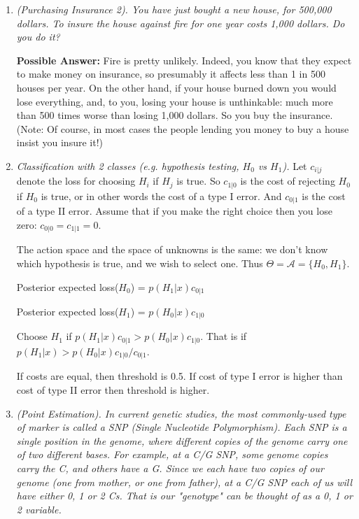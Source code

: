 \documentclass[12pt]{article}
\def\A{\mathcal A}
\begin{document}
\begin{enumerate}
\medskip

\item {\it (Purchasing Insurance 2). You have just bought a new house, for 500,000 dollars.
To insure the house against fire for one year costs 1,000 dollars. Do you do it?}

{\bf Possible Answer:}  Fire is pretty unlikely. Indeed, you know that they expect to make
money on insurance, so presumably it affects less than 1 in 500 houses per year. On the other
hand, if your house burned down you would lose everything, and, to you, 
losing your house is unthinkable: much more than 500 times worse than losing 1,000 dollars.
So you buy the insurance. (Note: Of course, in most cases the people lending you money to buy a house
insist you insure it!)

\item {\it Classification with 2 classes (e.g. hypothesis testing, $H_0$ vs $H_1$).} Let $c_{i|j}$ denote the loss for choosing $H_i$ if $H_j$ is true.
So $c_{1|0}$ is the cost of rejecting $H_0$ if $H_0$ is true, or in other words the cost of a type I error. 
And $c_{0|1}$ is the cost of a type II error.
Assume that if you make the right choice then you lose zero:
$c_{0|0}=c_{1|1}=0$.

The action space and the space of unknowns is the same: we
don't know which hypothesis is true, and we wish to select one.
 Thus $\Theta=\A=\{H_0,H_1\}$.

Posterior expected loss($H_0$) = $p(H_1 | x) c_{0|1}$

Posterior expected loss($H_1$) = $p(H_0 | x) c_{1|0}$

Choose $H_1$ if $p(H_1 | x) c_{0|1} > p(H_0 | x) c_{1|0}$.
That is if $p(H_1 | x) > p(H_0 | x) c_{1|0}/c_{0|1}$.

If costs are equal, then threshold is 0.5.
If cost of type I error is higher than cost of type II error
then threshold is higher.


\item {\it (Point Estimation). In current genetic studies, the most commonly-used type of marker is called a SNP (Single Nucleotide Polymorphism). Each SNP is a single position in the genome, where different copies of the genome carry one of two different bases. For example, at a C/G SNP, some genome copies carry the C, and others have a G. Since we each have two copies of our genome (one from mother,
or one from father), at a C/G SNP each of us will have either 0, 1 or 2 Cs. That is our "genotype" can be thought of as a 0, 1 or 2 variable.

}
\end{enumerate}
\end{document}
